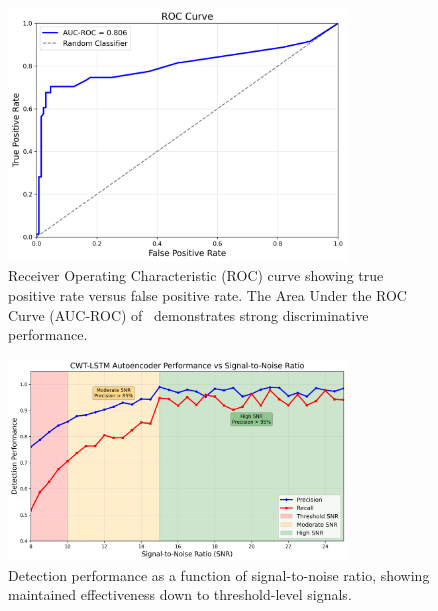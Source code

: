 \begin{figure}[htbp]
\centering
\includegraphics[width=0.8\textwidth]{figures/roc_curve.png}
\caption{Receiver Operating Characteristic (ROC) curve showing true positive rate versus false positive rate. The Area Under the ROC Curve (AUC-ROC) of \AUCVALUE\ demonstrates strong discriminative performance.}
\label{fig:roc_curve}
\end{figure}

\begin{figure}[htbp]
\centering
\includegraphics[width=0.8\textwidth]{figures/snr_performance.png}
\caption{Detection performance as a function of signal-to-noise ratio, showing maintained effectiveness down to threshold-level signals.}
\label{fig:snr_performance}
\end{figure}
